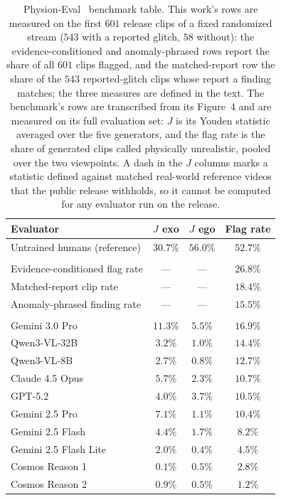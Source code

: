 
\begin{table}[t]
\centering\small
\renewcommand{\arraystretch}{1.2}
\begin{tabularx}{\textwidth}{@{}L c c c@{}}
\toprule
\textbf{Evaluator} & \textbf{$J$ exo} & \textbf{$J$ ego} & \textbf{Flag rate} \\
\midrule
Untrained humans (reference) & $30.7\%$ & $56.0\%$ & $52.7\%$ \\
\addlinespace
{} \\
\quad Evidence-conditioned flag rate & --- & --- & $\mathbf{26.8\%}$ \\
\quad Matched-report clip rate & --- & --- & $18.4\%$ \\
\quad Anomaly-phrased finding rate & --- & --- & $15.5\%$ \\
\addlinespace
{} \\
\quad Gemini 3.0 Pro & $11.3\%$ & $5.5\%$ & $16.9\%$ \\
\quad Qwen3-VL-32B & $3.2\%$ & $1.0\%$ & $14.4\%$ \\
\quad Qwen3-VL-8B & $2.7\%$ & $0.8\%$ & $12.7\%$ \\
\quad Claude 4.5 Opus & $5.7\%$ & $2.3\%$ & $10.7\%$ \\
\quad GPT-5.2 & $4.0\%$ & $3.7\%$ & $10.5\%$ \\
\quad Gemini 2.5 Pro & $7.1\%$ & $1.1\%$ & $10.4\%$ \\
\quad Gemini 2.5 Flash & $4.4\%$ & $1.7\%$ & $8.2\%$ \\
\quad Gemini 2.5 Flash Lite & $2.0\%$ & $0.4\%$ & $4.5\%$ \\
\quad Cosmos Reason 1 & $0.1\%$ & $0.5\%$ & $2.8\%$ \\
\quad Cosmos Reason 2 & $0.9\%$ & $0.5\%$ & $1.2\%$ \\
\bottomrule
\end{tabularx}
\caption{Physion-Eval~\cite{physioneval2026} benchmark table. This work's rows are
measured on the first $601$ release clips of a fixed randomized stream ($543$ with a
reported glitch, $58$ without): the evidence-conditioned and anomaly-phrased rows report
the share of all $601$ clips flagged, and the matched-report row the share of the $543$
reported-glitch clips whose report a finding matches; the three measures are defined in
the text. The benchmark's rows are transcribed from its Figure~4 and are measured on its
full evaluation set: $J$ is its Youden statistic averaged over the five generators, and
the flag rate is the share of generated clips called physically unrealistic, pooled over
the two viewpoints. A dash in the $J$ columns marks a statistic defined against matched
real-world reference videos that the public release withholds, so it cannot be computed
for any evaluator run on the release.}
\label{tab:physion}
\end{table}
